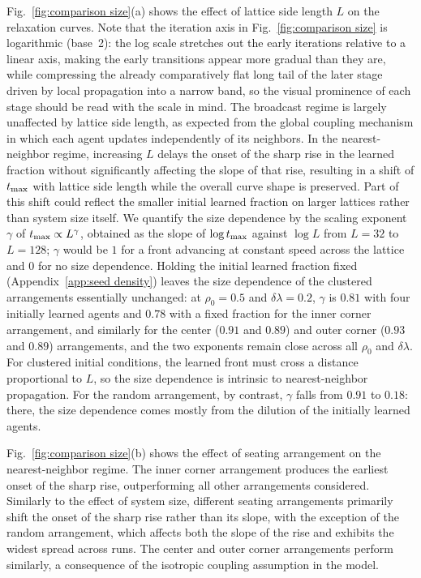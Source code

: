 \documentclass[a4paper,fleqn]{cas-sc}
\begin{document}
  Fig.~\ref{fig:comparison size}(a) shows the effect of lattice side length $L$ on the relaxation curves.
  Note that the iteration axis in Fig.~\ref{fig:comparison size} is logarithmic (base~2): the log scale stretches out the early iterations relative to a linear axis, making the early transitions appear more gradual than they are, while compressing the already comparatively flat long tail of the later stage driven by local propagation into a narrow band, so the visual prominence of each stage should be read with the scale in mind.
  The broadcast regime is largely unaffected by lattice side length, as expected from the global coupling mechanism in which each agent updates independently of its neighbors.
  In the nearest-neighbor regime, increasing $L$ delays the onset of the sharp rise in the learned fraction without significantly affecting the slope of that rise, resulting in a shift of $t_{\rm max}$ with lattice side length while the overall curve shape is preserved.
  Part of this shift could reflect the smaller initial learned fraction on larger lattices rather than system size itself.
  We quantify the size dependence by the scaling exponent $\gamma$ of $t_{\rm max}\propto L^{\gamma}$, obtained as the slope of $\log t_{\rm max}$ against $\log L$ from $L=32$ to $L=128$; $\gamma$ would be $1$ for a front advancing at constant speed across the lattice and $0$ for no size dependence.
  Holding the initial learned fraction fixed (Appendix~\ref{app:seed density}) leaves the size dependence of the clustered arrangements essentially unchanged: at $\rho_0=0.5$ and $\delta\lambda=0.2$, $\gamma$ is $0.81$ with four initially learned agents and $0.78$ with a fixed fraction for the inner corner arrangement, and similarly for the center ($0.91$ and $0.89$) and outer corner ($0.93$ and $0.89$) arrangements, and the two exponents remain close across all $\rho_0$ and $\delta\lambda$.
  For clustered initial conditions, the learned front must cross a distance proportional to $L$, so the size dependence is intrinsic to nearest-neighbor propagation.
  For the random arrangement, by contrast, $\gamma$ falls from $0.91$ to $0.18$: there, the size dependence comes mostly from the dilution of the initially learned agents.

  Fig.~\ref{fig:comparison size}(b) shows the effect of seating arrangement on the nearest-neighbor regime.
  The inner corner arrangement produces the earliest onset of the sharp rise, outperforming all other arrangements considered.
  Similarly to the effect of system size, different seating arrangements primarily shift the onset of the sharp rise rather than its slope, with the exception of the random arrangement, which affects both the slope of the rise and exhibits the widest spread across runs.
  The center and outer corner arrangements perform similarly, a consequence of the isotropic coupling assumption in the model.
\end{document}
